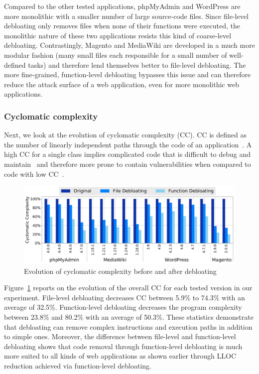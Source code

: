 Compared to the other
tested applications, phpMyAdmin and WordPress are more monolithic with a smaller number of large
source-code files. Since file-level debloating only removes files when none
of their functions were executed, the monolithic nature of these two applications resists
this kind of coarse-level debloating. Contrastingly, Magento and MediaWiki
are developed in a much more modular fashion (many small files each responsible
for a small number of well-defined tasks) and therefore lend themselves better to file-level
debloating. The more fine-grained, function-level debloating bypasses this
issue and can therefore reduce the attack surface of a web application,
even for more monolithic web applications.


\subsubsection{Cyclomatic complexity}
\label{subsubsec:cyclomatic-complexity}
Next, we look at the evolution of cyclomatic complexity (CC). CC is defined as
the number of linearly independent paths through the code of
an application~\cite{mccabe1976complexity}. A high CC for a
single class implies complicated code that is difficult to
debug and maintain~\cite{gill1991cyclomatic} and therefore
more prone to contain vulnerabilities when compared to code with low
CC~\cite{shin2008empirical,kurmus2013attack}.

\begin{figure}[t]
  \includegraphics[width=\linewidth]{figures/cc_over_loc.pdf}
  \caption{Evolution of cyclomatic complexity before and after debloating}
  \label{fig:ccoverloc}
\end{figure}

Figure~\ref{fig:ccoverloc} reports on the evolution of the overall CC for
each tested version in our experiment. File-level debloating decreases
CC between 5.9\% to 74.3\% with an average of 32.5\%.
Function-level debloating decreases the program complexity between 23.8\% and 80.2\% with an average of 50.3\%.
These statistics demonstrate that
debloating can remove complex instructions and execution paths in addition to
simple ones. Moreover, the difference between file-level and function-level
debloating shows that code removal through function-level debloating is much
more suited to all kinds of web applications as shown earlier through LLOC
reduction achieved via function-level debloating.


